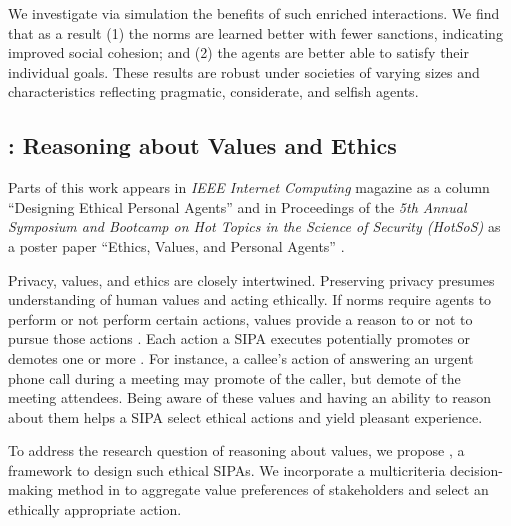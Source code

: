 We investigate via simulation the benefits
of such enriched interactions. We find
that as a result (1) the norms are learned better with
fewer sanctions, indicating improved social cohesion;
and (2) the agents are better able to satisfy
their individual goals. These results are robust under
societies of varying sizes and characteristics reflecting
pragmatic, considerate, and selfish agents.

\subsection[Reasoning about Values and Ethics]{\frameworkAinur: Reasoning about Values and Ethics}

Parts of this work appears in \emph{IEEE Internet Computing} magazine as a column ``Designing Ethical Personal Agents''
\citep{Ajmeri-IC18-Ethical}
and in Proceedings of the \emph{5th Annual Symposium and Bootcamp on Hot Topics in the Science of Security (HotSoS)} as a poster paper ``Ethics, Values, and Personal Agents''
\citep{HotSoS-18:ethics}.

Privacy, values, and ethics are closely intertwined. 
Preserving privacy presumes understanding of human values 
and acting ethically. 
% 
If norms require agents to perform or not perform certain actions,
values provide a reason to or not to pursue those actions
\citep{Dechesne-AIL13-Norms+Values}. Each action a \frameworkB SIPA
executes potentially promotes or demotes one or more .
For instance, a callee's action of
answering an urgent phone call during a meeting may promote 
of the caller, but demote  of the meeting attendees. 
Being aware of these values and having an ability to reason about them 
helps a SIPA select ethical actions and yield pleasant experience.

To address the research question of reasoning about values, we 
propose \frameworkAinur, a framework to design such ethical 
SIPAs. We incorporate a multicriteria decision-making method 
in \frameworkAinur to aggregate value preferences of stakeholders and 
select an ethically appropriate action. 

